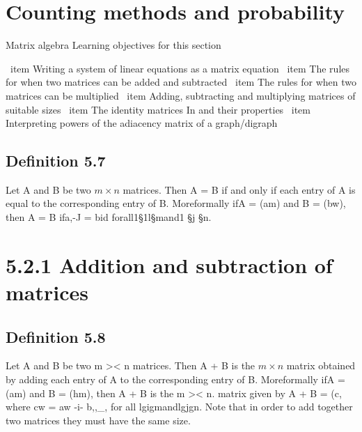 ﻿\documentclass{beamer}
\begin{document}
\tableofcontents

\section{Counting methods and probability}




{Matrix algebra}
Learning objectives for this section
\begin{itemize}
\ item  Writing a system of linear equations as a matrix equation
\ item The rules for when two matrices can be added and subtracted
\ item The rules for when two matrices can be multiplied
\ item Adding, subtracting and multiplying matrices of suitable sizes
\ item The identity matrices In and their properties
\ item Interpreting powers of the adiacency matrix of a graph/digraph
\end{itemize}


\subsection{Definition 5.7} 
Let A and B be two $m \times n$ matrices. Then A = B if and
only if each entry of A is equal to the corresponding entry of B.
Moreformally ifA = (am) and B = (bw), then A = B ifa,-J = bid
forall1§1l§mand1 §j §n.
\section{5.2.1 Addition and subtraction of matrices}
\subsection{Definition 5.8} Let A and B be two m >< n matrices. Then A + B is the
$m \times  n$ matrix obtained by adding each entry of A to the corresponding
entry of B.
Moreformally ifA = (am) and B = (hm), then A + B is the m >< n.
matrix given by A + B = (c, where cw = aw -i- b,,_, for all
lgigmandlgjgn.
Note that in order to add together two matrices they must have the
same size.
\end{document}
